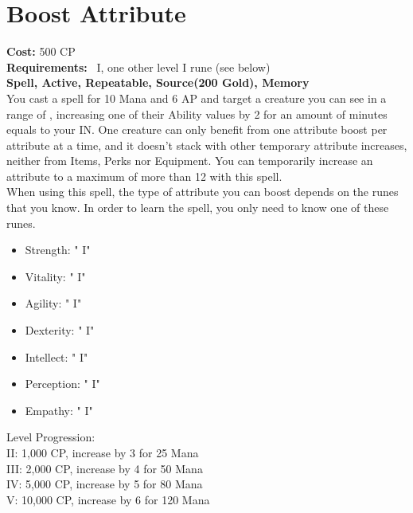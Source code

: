 \section{Boost Attribute}\label{spell:boostAttribute}
\textbf{Cost:} 500 CP\\
\textbf{Requirements:}~ I, one other level I rune (see below)\\
\textbf{Spell, Active, Repeatable, Source(200 Gold), Memory}\\
You cast a spell for 10 Mana and 6 AP and target a creature you can see in a range of , increasing one of their Ability values by 2 for an amount of minutes equals to your IN.
One creature can only benefit from one attribute boost per attribute at a time, and it doesn't stack with other temporary attribute increases, neither from Items, Perks nor Equipment.
You can temporarily increase an attribute to a maximum of more than 12 with this spell.\\
When using this spell, the type of attribute you can boost depends on the runes that you know.
In order to learn the spell, you only need to know one of these runes.\\
\begin{itemize}
    \item Strength: " I"
    \item Vitality: " I"
    \item Agility: " I"
    \item Dexterity: " I"
    \item Intellect: " I"
    \item Perception: " I"
    \item Empathy: " I"
\end{itemize}
Level Progression:\\
II: 1,000 CP, increase by 3 for 25 Mana\\
III: 2,000 CP, increase by 4 for 50 Mana\\
IV: 5,000 CP, increase by 5 for 80 Mana\\
V: 10,000 CP, increase by 6 for 120 Mana\\
